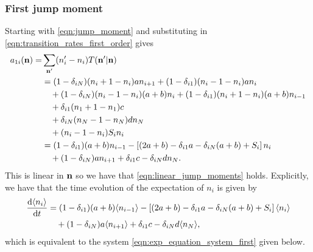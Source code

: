 \subsubsection{First jump moment}
Starting with \eqref{eqn:jump_moment} and substituting in
\eqref{eqn:transition_rates_first_order} gives
\begin{equation}
    \begin{aligned}
        a_{1i}(\mathbf{n}) =& \sum_{\mathbf{n}'} (n_i' - n_i) T(\mathbf{n}' | \mathbf{n})\\
        &= (1-\delta_{iN})(n_i + 1 - n_i)a n_{i+1}
        +  (1-\delta_{i1})(n_i - 1 - n_i)a n_i\\
        &\quad+ (1-\delta_{iN})(n_i - 1 - n_i)(a+b) n_i
        +  (1-\delta_{i1})(n_i + 1 - n_i)(a+b) n_{i-1}\\
        &\quad+ \delta_{i1}(n_1 + 1 - n_1) c\\
        &\quad+ \delta_{iN}(n_N - 1 - n_N) d n_N\\
        &\quad+ (n_i - 1 - n_i) S_i n_i\\
        &= (1-\delta_{i1})(a+b)n_{i-1} - \left[(2a+b) - \delta_{i1}a -
        \delta_{iN}(a+b) + S_i\right]n_i\\
        &\quad+ (1-\delta_{iN})an_{i+1} + \delta_{i1}c - \delta_{iN}d n_N.
    \end{aligned}
    \label{eqn:first_jump_mom_first_order}
\end{equation}
This is linear in \(\mathbf{n}\) so we have that \eqref{eqn:linear_jump_moments}
holds. Explicitly, we have that the time evolution of the expectation of \(n_i\)
is given by
\begin{equation}
    \begin{aligned}
        \frac{\mathrm{d} \langle n_i \rangle}{\mathrm{d} t} &= (1-\delta_{i1})(a+b)\langle n_{i-1} \rangle - \left[(2a+b) -
        \delta_{i1}a - \delta_{iN}(a+b) + S_i\right]\langle n_i \rangle\\
        &\quad+(1-\delta_{iN})a\langle n_{i+1} \rangle + \delta_{i1}c - \delta_{iN}d \langle n_N \rangle,
    \end{aligned}
\end{equation}
which is equivalent to the system \eqref{eqn:exp_equation_system_first} given
below.
